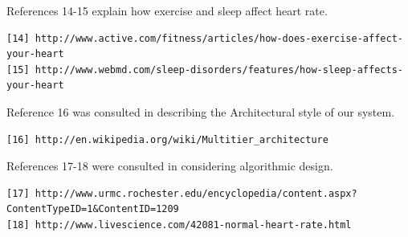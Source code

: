 \documentclass[letterpaper,english, 12pt]{scrreprt}
\begin{document}
References 14-15 explain how exercise and sleep affect heart rate.
\begin{verbatim}
[14] http://www.active.com/fitness/articles/how-does-exercise-affect-your-heart
[15] http://www.webmd.com/sleep-disorders/features/how-sleep-affects-your-heart
\end{verbatim}

Reference 16 was consulted in describing the Architectural style of our system.
\begin{verbatim}
[16] http://en.wikipedia.org/wiki/Multitier_architecture
\end{verbatim}

References 17-18 were consulted in considering algorithmic design.
\begin{verbatim}
[17] http://www.urmc.rochester.edu/encyclopedia/content.aspx?ContentTypeID=1&ContentID=1209
[18] http://www.livescience.com/42081-normal-heart-rate.html
\end{verbatim}
\end{document}
